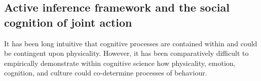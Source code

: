 \begin{CJK}{UTF8}{gbsn}






\subsection{Active inference framework and the social cognition of joint action}
It has been long intuitive that cognitive processes are contained within and could be contingent upon physicality. However, it has been comparatively difficult to empirically demonstrate within cognitive science how physicality, emotion, cognition, and culture could co-determine processes of behaviour.


\end{CJK}

